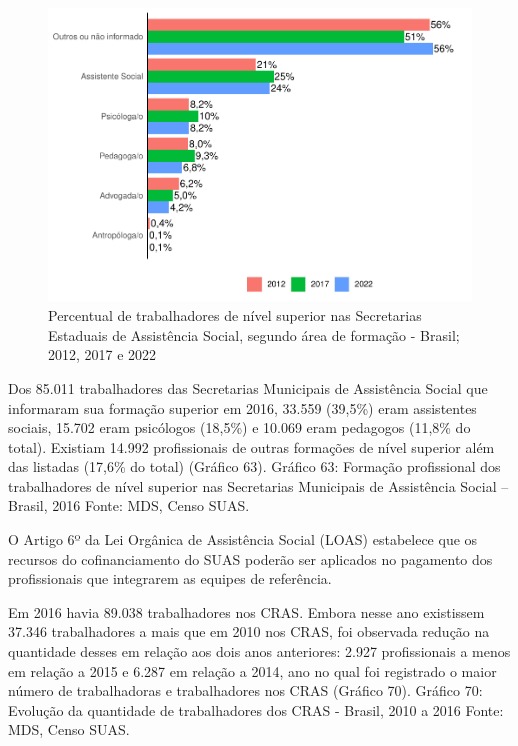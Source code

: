 \documentclass[
  brazilian]{report}
\begin{document}
\begin{figure}
\includegraphics{Censo-SUAS-2022_files/figure-latex/uf_trab_prof-1} \caption[Percentual de trabalhadores de nível superior nas Secretarias Estaduais de Assistência Social, segundo área de formação - Brasil]{Percentual de trabalhadores de nível superior nas Secretarias Estaduais de Assistência Social, segundo área de formação - Brasil; 2012, 2017 e 2022}\label{fig:uf_trab_prof}
\end{figure}

Dos 85.011 trabalhadores das Secretarias Municipais de Assistência
Social que informaram sua formação superior em 2016, 33.559 (39,5\%)
eram assistentes sociais, 15.702 eram psicólogos (18,5\%) e 10.069 eram
pedagogos (11,8\% do total). Existiam 14.992 profissionais de outras
formações de nível superior além das listadas (17,6\% do total) (Gráfico
63). Gráfico 63: Formação profissional dos trabalhadores de nível
superior nas Secretarias Municipais de Assistência Social -- Brasil,
2016 Fonte: MDS, Censo SUAS.

O Artigo 6º da Lei Orgânica de Assistência Social (LOAS) estabelece que
os recursos do cofinanciamento do SUAS poderão ser aplicados no
pagamento dos profissionais que integrarem as equipes de referência.

Em 2016 havia 89.038 trabalhadores nos CRAS. Embora nesse ano existissem
37.346 trabalhadores a mais que em 2010 nos CRAS, foi observada redução
na quantidade desses em relação aos dois anos anteriores: 2.927
profissionais a menos em relação a 2015 e 6.287 em relação a 2014, ano
no qual foi registrado o maior número de trabalhadoras e trabalhadores
nos CRAS (Gráfico 70). Gráfico 70: Evolução da quantidade de
trabalhadores dos CRAS - Brasil, 2010 a 2016 Fonte: MDS, Censo SUAS.
\end{document}
